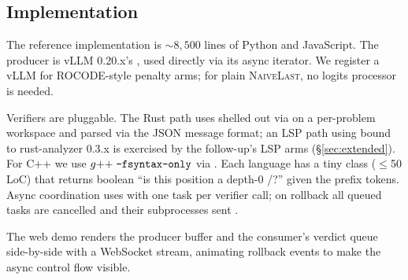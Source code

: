 \subsection{Implementation}\label{sec:impl}

The reference implementation \citep{soundcode2025github} is
${\sim}8{,}500$ lines of Python and JavaScript. The producer is
vLLM 0.20.x's , used directly via its
 async iterator. We register a vLLM
 for ROCODE-style penalty arms; for plain
\textsc{NaiveLast}, no logits processor is needed.

Verifiers are pluggable. The Rust path uses 
shelled out via  on a per-problem workspace and
parsed via the JSON message format; an LSP path using
 \citep{agrawal2023monitor,multilspy} bound to
rust-analyzer 0.3.x is exercised by the follow-up's LSP arms
(\S\ref{sec:extended}).
For C++ we use $g{+}{+}\;\texttt{-fsyntax-only}$ via .
Each language has a tiny  class
($\leq$50 LoC) that returns boolean ``is this position a depth-0
\code{;}/\code{\}}?'' given the prefix tokens. Async coordination
uses  with one task per verifier call; on rollback
all queued tasks are cancelled and their subprocesses sent
.

The web demo \citep{soundcode2025github} renders the producer
buffer and the consumer's verdict queue side-by-side with a
WebSocket stream, animating rollback events to make the async
control flow visible.
